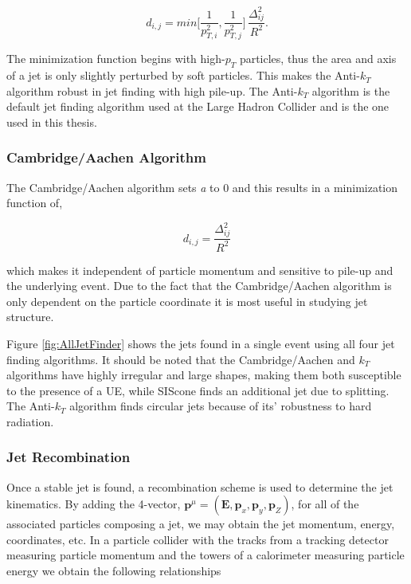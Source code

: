 \begin{equation}
d_{i,j} = min \Bigg [\frac{1}{p^{2}_{T,i}}, \frac{1}{p^{2}_{T,j}} \Bigg ] \, \frac{\Delta^{2}_{ij}}{R^{2}}.
\label{eq:Akt}
\end{equation}

The minimization function begins with high-$p_{T}$ particles, thus the area and axis of a jet is only slightly perturbed by soft particles.  This makes the Anti-$k_{T}$ algorithm robust in jet finding with high pile-up.  The Anti-$k_{T}$ algorithm is the default jet finding algorithm used at the Large Hadron Collider and is the one used in this thesis.

\subsubsection{Cambridge/Aachen Algorithm}

The Cambridge/Aachen algorithm sets \textit{a} to 0 and this results in a minimization function of,

\begin{equation}
d_{i,j} = \frac{\Delta^{2}_{ij}}{R^{2}}
\label{eq:CBalg}
\end{equation}

\noindent
which makes it independent of particle momentum and sensitive to pile-up and the underlying event.  Due to the fact that the Cambridge/Aachen algorithm is only dependent on the particle coordinate it is most useful in studying jet structure.

Figure \ref{fig:AllJetFinder} shows the jets found in a single event using all four jet finding algorithms.  It should be noted that the Cambridge/Aachen and $k_{T}$ algorithms have highly irregular and large shapes, making them both susceptible to the presence of a UE, while SIScone finds an additional jet due to splitting.  The Anti-$k_{T}$ algorithm finds circular jets because of its' robustness to hard radiation.  


\subsubsection{Jet Recombination}
Once a stable jet is found, a recombination scheme is used to determine the jet kinematics.  By adding the 4-vector, $\boldsymbol{p}^{\mu} = (\boldsymbol{E},\boldsymbol{p}_{x},\boldsymbol{p}_{y},\boldsymbol{p}_{Z})$, for all of the associated particles composing a jet, we may obtain the jet momentum, energy, coordinates, etc.  In a particle collider with the tracks from a tracking detector measuring particle momentum and the towers of a calorimeter measuring particle energy we obtain the following relationships



